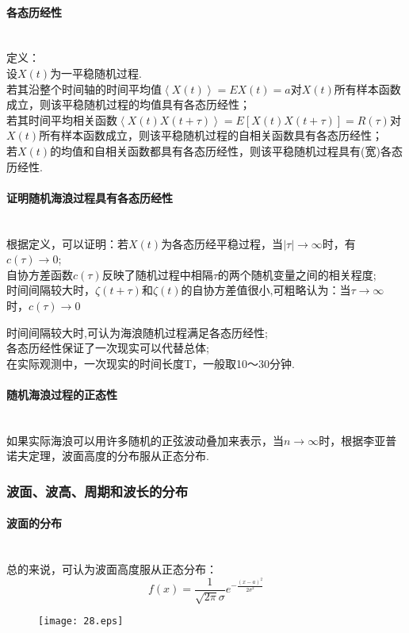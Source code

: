 \documentclass[a4paper,12pt]{article}
\begin{document}
    \paragraph{各态历经性}~{}\\
    定义：\\
    设$X(t)$为一平稳随机过程.\\
    若其沿整个时间轴的时间平均值$\left\langle X(t) \right\rangle =E{X(t)}=a$对$X(t)$所有样本函数成立，则该平稳随机过程的均值具有各态历经性；\\
    若其时间平均相关函数$\left\langle X(t)X(t+\tau)\right\rangle=E[X(t)X(t+\tau)]=R(\tau)$对$X(t)$所有样本函数成立，则该平稳随机过程的自相关函数具有各态历经性；\\
    若$X(t)$的均值和自相关函数都具有各态历经性，则该平稳随机过程具有(宽)各态历经性.\\
    \paragraph{证明随机海浪过程具有各态历经性}~{}\\
    根据定义，可以证明：若$X(t)$为各态历经平稳过程，当$|\tau|\rightarrow \infty$时，有$c(\tau)\rightarrow 0$;\\
    自协方差函数$c(\tau)$反映了随机过程中相隔$\tau$的两个随机变量之间的相关程度;\\
    时间间隔较大时，$\zeta(t+\tau)$和$\zeta(t)$的自协方差值很小,可粗略认为：当$\tau\rightarrow\infty$时，$c(\tau)\rightarrow 0$\\
    \begin{framed}
        时间间隔较大时,可认为海浪随机过程满足各态历经性;\\
        各态历经性保证了一次现实可以代替总体;\\
        在实际观测中，一次现实的时间长度T，一般取10～30分钟.
    \end{framed}
    \paragraph{随机海浪过程的正态性}~{}\\
    如果实际海浪可以用许多随机的正弦波动叠加来表示，当$n\rightarrow\infty$时，根据李亚普诺夫定理，波面高度的分布服从正态分布.
    \subsubsection{波面、波高、周期和波长的分布}
    \paragraph{波面的分布}~{}\\
    总的来说，可认为波面高度服从正态分布：
    \[
        f(x)=\frac{1}{\sqrt{2\pi}\sigma}e^{-\frac{(x-a)^2}{2\sigma^2}}
    \]
    \begin{figure}[H]
        \centering\texttt{[image: 28.eps]}
        \caption*{}
    \end{figure}
\end{document}
